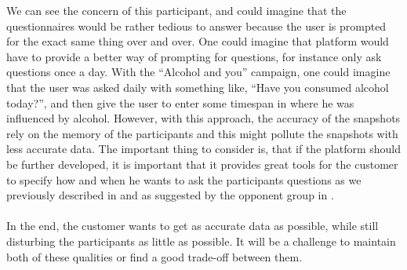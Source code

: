 \begin{quote}
\end{quote}

We can see the concern of this participant, and could imagine that the questionnaires would be rather tedious to answer because the user is prompted for the exact same thing over and over. One could imagine that platform would have to provide a better way of prompting for questions, for instance only ask questions once a day. With the ``Alcohol and you'' campaign, one could imagine that the user was asked daily with something like, ``Have you consumed alcohol today?'', and then give the user to enter some timespan in where he was influenced by alcohol. However, with this approach, the accuracy of the snapshots rely on the memory of the participants and this might pollute the snapshots with less accurate data. The important thing to consider is, that if the platform should be further developed, it is important that it provides great tools for the customer to specify how and when he wants to ask the participants questions as we previously described in  and as suggested by the opponent group in . 
\\\\
In the end, the customer wants to get as accurate data as possible, while still disturbing the participants as little as possible. It will be a challenge to maintain both of these qualities or find a good trade-off between them.
